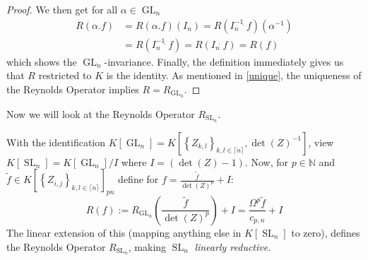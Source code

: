 \begin{proof}
  We then get for all $ \alpha \in \operatorname{GL}_n $
  \begin{equation}
    \begin{aligned}
      R \left( \alpha . f \right)
      &= R \left( \alpha . f \right) \left( I_n \right)
      = R \left( I_n^{-1} \dot{\phantom{.}} f \right) \left( \alpha^{-1} \right) \\
     & = R \left( I_n^{-1} \dot{\phantom{.}} f \right)
      = R \left( I_n \dot{\phantom{.}} f \right) 
      = R (f)
  \end{aligned}
  \end{equation}
  which shows the $\operatorname{GL}_n$-invariance.
  Finally, the definition immediately gives us that $R$ restricted to $K$ is the identity.  As mentioned in \ref{unique}, the uniqueness of the Reynolds Operator implies $ R = R_{\operatorname{GL}_n} $.
\end{proof}

Now we will look at the Reynolds Operator $R_{\operatorname{SL}_n}$.

\begin{corollary}
  With the identification $ K \left\lbrack \operatorname{GL}_n \right\rbrack = K \left\lbrack \left\{ Z_{k,l} \right\}_{k,l \in \lceil n \rceil} , \operatorname{det} (Z) ^{-1} \right\rbrack $, view $ K \left\lbrack \operatorname{SL}_n \right\rbrack = K \left\lbrack \operatorname{GL}_n \right\rbrack / I $ where $ I = \left( \operatorname{det} (Z) -1 \right) $.
  Now, for $ p \in \mathbb{N} $ and $ \tilde{f} \in K \left\lbrack \left\{ Z_{i,j} \right\}_{k,l \in \lceil n \rceil} \right\rbrack_{pn} $ define for $ f = \frac{\tilde{f}}{\operatorname{det}(Z)^p} + I $:
  \begin{equation}
    R \left( f \right)
    := R_{\operatorname{GL}_n} \left( \frac{\tilde{f}}{\operatorname{det}(Z)^p} \right) + I
    = \frac{\Omega^p \tilde{f}}{c_{p,n}} + I
  \end{equation}
  The linear extension of this (mapping anything else in $K \left\lbrack \operatorname{SL}_n \right\rbrack$ to zero), defines the Reynolds Operator $R_{\operatorname{SL}_n}$, making $\operatorname{SL}_n$ \textit{linearly reductive}.
\end{corollary}

